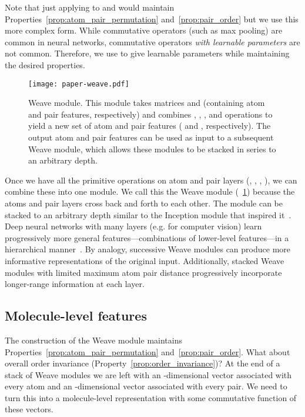 Note that just applying  to  and  would maintain
Properties~\ref{prop:atom_pair_permutation} and~\ref{prop:pair_order} but we use
this more complex form. While commutative operators (such as max pooling) are
common in neural networks, commutative operators \emph{with learnable
parameters} are not common. Therefore, we use  to give learnable parameters
while maintaining the desired properties.

\begin{figure}[tb]
\centering
  \texttt{[image: paper-weave.pdf]}
  \caption{Weave module. This module takes matrices  and  (containing
  atom and pair features, respectively) and combines ,
  , , and  operations to yield a
  new set of atom and pair features ( and , respectively). The
  output atom and pair features can be used as input to a subsequent Weave
  module, which allows these modules to be stacked in series to an arbitrary
  depth.}
  \label{fig:weave}
\end{figure}
Once we have all the primitive operations on atom and pair layers
(, , , ), we
can combine these into one module.  We call this the Weave module
(\figurename~\ref{fig:weave}) because the atoms and pair layers cross back and forth
to each other. The module can be stacked to an arbitrary depth similar to the
Inception module that inspired it~\citep{szegedy2014going}.
Deep neural networks with many layers (e.g. for computer vision) learn
progressively more general features---combinations of lower-level features---in
a hierarchical manner~\citep{lecun2015deep}. By analogy, successive Weave
modules can produce more informative representations of the original input.
Additionally, stacked Weave modules with limited maximum atom pair distance
progressively incorporate longer-range information at each layer.

\subsection{Molecule-level features}
\label{sec:features}

The construction of the Weave module maintains
Properties~\ref{prop:atom_pair_permutation} and~\ref{prop:pair_order}. What
about overall order invariance (Property~\ref{prop:order_invariance})? At the
end of a stack of Weave modules we are left with an -dimensional
vector associated with every atom and an -dimensional vector associated with
every pair. We need to turn this into a molecule-level representation with some
commutative function of these vectors.

